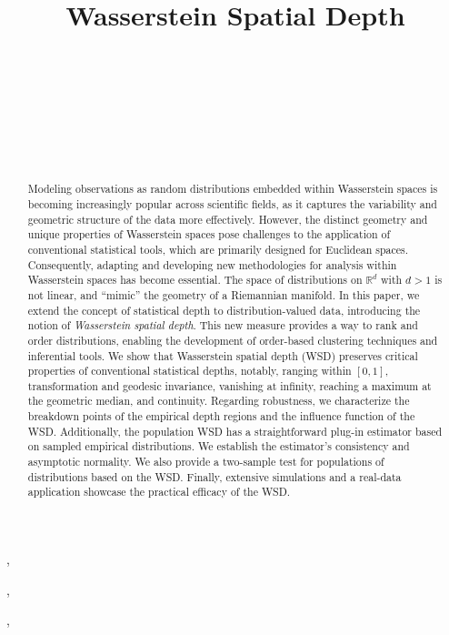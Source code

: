 \documentclass{imsart}
\numberwithin{equation}{section}
\begin{document}
\begin{frontmatter}
\title{Wasserstein Spatial Depth}


\begin{aug}

\author[A]{~},
\author[B]{~},
\author[C]{~},
\author[D]{~}



\address[A]{Universit\'e de Lille, Institut universitaire de France (IUF),
	France, }


\address[B]{Department of Statistics,
	Columbia University, New York, USA, }

\address[C]{INRIA,  Universit\'e de Toulouse, France, }

\address[D]{Department of Statistics,
	Columbia University, New York, USA, }
\end{aug}

\begin{abstract}
Modeling observations as random distributions embedded within Wasserstein spaces is becoming increasingly popular across scientific fields, as it captures the variability and geometric structure of the data more effectively. However, the distinct geometry and unique properties of Wasserstein spaces pose challenges to the application of conventional statistical tools, which are primarily designed for Euclidean spaces. Consequently, adapting and developing new methodologies for analysis within Wasserstein spaces has become essential.
The space of distributions on $\mathbb{R}^d$ with $d>1$ is not linear, and ``mimic'' the geometry of a Riemannian manifold.  In this paper, we extend the concept of statistical depth to distribution-valued data, introducing the notion of {\it Wasserstein spatial depth}. This new measure provides a way to rank and order distributions, enabling the development of order-based clustering techniques and inferential tools.  We show that Wasserstein spatial depth (WSD) preserves critical properties of conventional statistical depths, notably, ranging within $[0,1]$, transformation and geodesic invariance, vanishing at infinity, reaching a maximum at the geometric median, and continuity. 
Regarding robustness, we characterize the breakdown points of the empirical depth regions and the influence function of the WSD.
Additionally, the population WSD has a straightforward plug-in estimator based on sampled empirical distributions. We establish the estimator's consistency and asymptotic normality.
We also provide a two-sample test for populations of distributions based on the WSD.
Finally, extensive simulations and a real-data application showcase the practical efficacy of the WSD.
\end{abstract}


\end{frontmatter}
\end{document}
